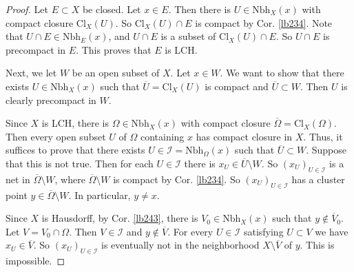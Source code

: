 \documentclass[12pt,b5paper,notitlepage]{article}
\theoremstyle{definition}
\theoremstyle{plain}
\newcommand{\mc}{\mathcal}
\newcommand{\ovl}{\overline}
\newcommand{\Nbh}{\mathrm{Nbh}}
\newcommand{\Cl}{\mathrm{Cl}}
\numberwithin{equation}{section}
\begin{document}
\begin{proof}
Let $E\subset X$ be closed. Let $x\in E$. Then there is $U\in\Nbh_X(x)$ with compact closure $\Cl_X(U)$. So $\Cl_X(U)\cap E$ is compact by Cor. \ref{lb234}. Note that $U\cap E\in \Nbh_E(x)$, and $U\cap E$ is a subset of $\Cl_X(U)\cap E$. So $U\cap E$ is precompact in $E$. This proves that $E$ is LCH.

Next, we let $W$ be an open subset of $X$. Let $x\in W$. We want to show that there exists $U\in\Nbh_X(x)$ such that $\ovl U=\Cl_X(U)$ is compact and $\ovl U\subset W$. Then $U$ is clearly precompact in $W$.

Since $X$ is LCH, there is $\Omega\in\Nbh_X(x)$ with compact closure $\ovl\Omega=\Cl_X(\Omega)$. Then every open subset $U$ of $\Omega$ containing $x$ has compact closure in $X$. Thus, it suffices to prove that there exists $U\in\mc I=\Nbh_\Omega(x)$  such that $\ovl U\subset W$. Suppose that this is not true. Then for each $U\in\mc I$ there is $x_U\in \ovl U\setminus W$. So $(x_U)_{U\in\mc I}$ is a net in $\ovl\Omega\setminus W$, where $\ovl\Omega\setminus W$ is compact by Cor. \ref{lb234}. So $(x_U)_{U\in\mc I}$ has a cluster point $y\in\ovl\Omega\setminus W$. In particular, $y\neq x$.

Since $X$ is Hausdorff, by Cor. \ref{lb243}, there is $V_0\in\Nbh_X(x)$ such that $y\notin\ovl V_0$. Let $V=V_0\cap\Omega$. Then $V\in\mc I$ and $y\notin \ovl V$. For every $U\in\mc I$ satisfying $U\subset V$ we have $x_U\in\ovl V$. So $(x_U)_{U\in\mc I}$ is eventually not in the neighborhood $X\setminus \ovl V$ of $y$. This is impossible.
\end{proof}


\begin{comment}


Case 1: Assume that $X$ is compact Hausdorff.  Then $B=X\setminus W$ is compact by Cor. \ref{lb234}. Since $X$ is Hausdorff, for each $y\in B$ there exists $V_y\in\Nbh_X(y)$ such that $x\notin \ovl V_y$. (Recall Cor. \ref{lb243}.) Since $B$ is compact, there are $y_1,\dots,y_n\in B$ such that $B\subset V$ where $V=V_{y_1}\cup\cdots\cup V_{y_n}$. By \eqref{eq73}, $\ovl V=\ovl V_{y_1}\cup\cdots\cup \ovl V_{y_n}$. So $x\notin\ovl V$. Now $X\setminus V$ is a closed subset of $X$, and hence 

Let $U=X\setminus \ovl V$. Then $x\in U$. Since $U\subset X\setminus V$ and $X\setminus V$ is closed, $\ovl U\subset X\setminus V$, and hence $\ovl U\subset W$. Since $X$ is compact, $U$ is precompact.


Case 2: $X$ is LCH. Choose a precompact $\Omega\in\Nbh_X(x)$. By case 1 (applied to $\ovl\Omega$), and by the definition of subspace topology, there exists $V\in\Nbh_X(x)$ such that $x\in V\cap \ovl\Omega\subset\Cl_{\ovl\Omega}(V\cap \ovl\Omega)\subset W\cap\ovl\Omega$. By Rem. \ref{lb182}, we have $\Cl_{\ovl\Omega}(V\cap \ovl\Omega)= \ovl{V\cap\ovl\Omega}\cap\ovl\Omega$, which contains $\ovl{V\cap\Omega}$ since both $\ovl{V\cap\ovl\Omega}$ and $\ovl\Omega$ do. So $x\in U\subset\ovl U\subset W$ where $U=V\cap\Omega$. Since $\Omega$ is precompact, $U$ is precompact.
\end{comment}
\end{document}
